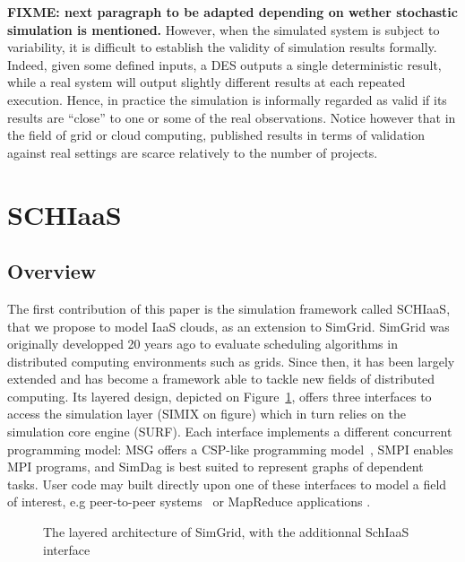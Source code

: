 \textbf{FIXME: next paragraph to be adapted depending on wether stochastic
  simulation is mentioned.}
However, when the simulated system is subject to variability, it is difficult to
establish  the  validity of  simulation  results  formally. Indeed,  given  some
defined inputs, a DES outputs a single deterministic result, while a real system
will output  slightly different results  at each repeated execution.   Hence, in
practice  the simulation  is informally  regarded as  valid if  its results  are
``close'' to one or  some of the real observations.  Notice  however that in the
field  of grid  or cloud  computing, published  results in  terms of  validation
against real settings are scarce relatively to the number of projects.



\section{SCHIaaS}
\label{sc:schiaas}

\subsection{Overview}
The first contribution of this paper is the simulation framework called SCHIaaS,
that we propose  to model IaaS clouds,  as an extension to  SimGrid. SimGrid was
originally  developped  20  years  ago  to  evaluate  scheduling  algorithms  in
distributed  computing environments  such as  grids.   Since then,  it has  been
largely  extended and  has  become a  framework  able to  tackle  new fields  of
distributed     computing.      Its      layered     design,     depicted     on
Figure~\ref{fg:sg-archi}, offers three interfaces to access the simulation layer
(SIMIX on  figure) which in  turn relies on  the simulation core  engine (SURF).
Each interface implements a different concurrent programming model: MSG offers a
CSP-like programming model~\cite{Hoare78}, SMPI  enables MPI programs, and SimDag
is best  suited to  represent graphs  of dependent tasks.   User code  may built
directly  upon  one of  these  interfaces  to model  a  field  of interest,  e.g
peer-to-peer     systems~\cite{QuinsonRT12}     or    MapReduce     applications
\cite{KolbergMAMGA13}.
%
\begin{figure}[hbt]
\centering
\resizebox{.7\textwidth}{!}{%

}
\caption{The  layered  architecture of  SimGrid,  with  the additionnal  SchIaaS
  interface}
\label{fg:sg-archi}
\end{figure}


